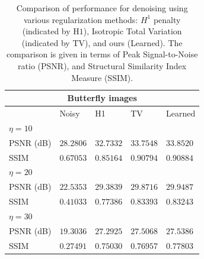\documentclass[onefignum,onetabnum]{siamonline250211}
\begin{document}
\begin{table}[ht!]\label{table:1}
\centering
\begin{tabular}{ |p{2.5cm}||p{2cm}|p{2cm}|p{2cm}|p{2cm}|  }
 \hline
 \multicolumn{5}{|c|}{Butterfly images} \\
 \hline
  & Noisy & H1 & TV & Learned \\
 \hline
 \hline
$\eta=10$ &&&& \\
PSNR (dB) & $ 28.2806 $ & $ 32.7332 $ & $ 33.7548 $ & $ \mathbf{33.8520} $ \\ 
SSIM & $ 0.67053 $ & $ 0.85164 $ & $ 0.90794 $ & $ \mathbf{0.90884} $ \\ 
 \hline
 \hline
$\eta=20$ & & & & \\
PSNR (dB) & $ 22.5353 $ & $ 29.3839 $ & $ 29.8716 $ & $ \mathbf{29.9487} $ \\ 
SSIM & $ 0.41033 $ & $ 0.77386 $ & $ \mathbf{0.83393} $ & $ 0.83243 $ \\ 
 \hline
 \hline
$\eta=30$ &&&& \\
PSNR (dB) & $ 19.3036 $ & $ 27.2925 $ & $ 27.5068 $ & $ \mathbf{27.5386} $ \\ 
SSIM & $ 0.27491 $ & $ 0.75030 $ & $ 0.76957 $ & $ \mathbf{0.77803} $ \\ 
 \hline
\end{tabular}
\caption{Comparison of performance for denoising using various regularization methods: $H^1$ penalty (indicated by $\mathrm{H1}$), Isotropic Total Variation (indicated by $\mathrm{TV}$), and ours (Learned). The comparison is given in terms of Peak Signal-to-Noise ratio (PSNR), and Structural Similarity Index Measure (SSIM).}
\end{table}
\end{document}
